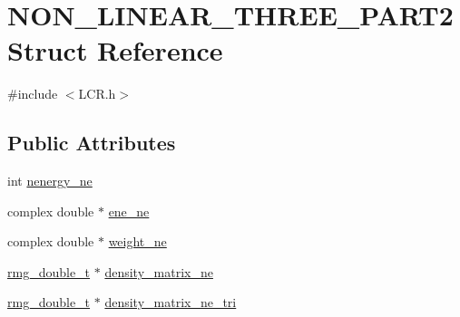 \hypertarget{struct_n_o_n___l_i_n_e_a_r___t_h_r_e_e___p_a_r_t2}{\section{N\-O\-N\-\_\-\-L\-I\-N\-E\-A\-R\-\_\-\-T\-H\-R\-E\-E\-\_\-\-P\-A\-R\-T2 Struct Reference}
\label{struct_n_o_n___l_i_n_e_a_r___t_h_r_e_e___p_a_r_t2}
}


{\ttfamily \#include $<$L\-C\-R.\-h$>$}

\subsection*{Public Attributes}
\begin{DoxyCompactItemize}
\item 
int \hyperlink{struct_n_o_n___l_i_n_e_a_r___t_h_r_e_e___p_a_r_t2_af1954d128a60c9389fb2c0f53439afee}{nenergy\-\_\-ne}
\item 
complex double $\ast$ \hyperlink{struct_n_o_n___l_i_n_e_a_r___t_h_r_e_e___p_a_r_t2_a484b835ec5dc28cd7ac3c69443a19087}{ene\-\_\-ne}
\item 
complex double $\ast$ \hyperlink{struct_n_o_n___l_i_n_e_a_r___t_h_r_e_e___p_a_r_t2_afc7255e08ced14f92e07173a88f7aee6}{weight\-\_\-ne}
\item 
\hyperlink{rmgtypes_8h_aaa16921c14f121c56eaa42390a340db8}{rmg\-\_\-double\-\_\-t} $\ast$ \hyperlink{struct_n_o_n___l_i_n_e_a_r___t_h_r_e_e___p_a_r_t2_a5df1179c2ddb66ded7ca5b837770e2a7}{density\-\_\-matrix\-\_\-ne}
\item 
\hyperlink{rmgtypes_8h_aaa16921c14f121c56eaa42390a340db8}{rmg\-\_\-double\-\_\-t} $\ast$ \hyperlink{struct_n_o_n___l_i_n_e_a_r___t_h_r_e_e___p_a_r_t2_a20fa2b3b83179abef7058d03502c71b2}{density\-\_\-matrix\-\_\-ne\-\_\-tri}
\end{DoxyCompactItemize}


